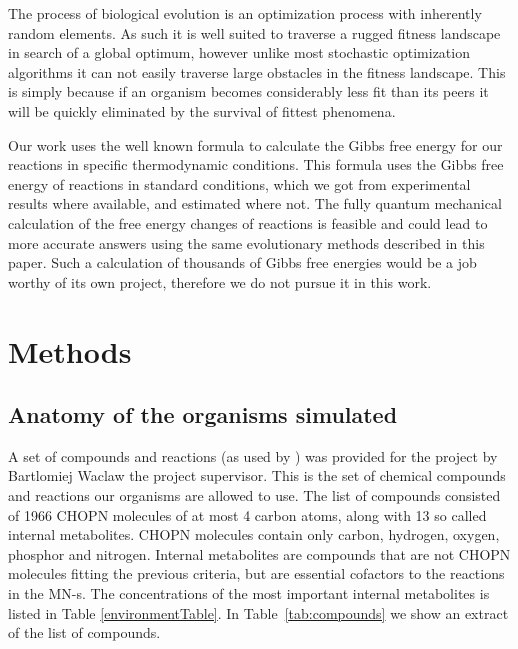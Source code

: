 \documentclass[a4paper,12pt]{article}
\begin{document}
	The process of biological evolution is an optimization process with inherently random elements. As such it is well suited to traverse a rugged fitness landscape in search of a global optimum, however unlike most stochastic optimization algorithms it can not easily traverse large obstacles in the fitness landscape. This is simply because if an organism becomes considerably less fit than its peers it will be quickly eliminated by the survival of fittest phenomena.

	Our work uses the well known formula to calculate the Gibbs free energy for our reactions in specific thermodynamic conditions. This formula uses the Gibbs free energy of reactions in standard conditions, which we got from experimental results where available, and estimated \cite{BartekLower} where not. The fully quantum mechanical calculation of the free energy changes of reactions is feasible and could lead to more accurate answers using the same evolutionary methods described in this paper. Such a calculation of thousands of Gibbs free energies would be a job worthy of its own project, therefore we do not pursue it in this work. 

	
\section{Methods}
\label{sec:methods}



	\subsection{Anatomy of the organisms simulated}
	\label{ssub:anatomy_of_the_oganisms_simulated}


	A set of compounds and reactions (as used by \cite[]{BartekLower}) was provided for the project by Bartlomiej Waclaw the project supervisor. This is the set of chemical compounds and reactions our organisms are allowed to use. The list of compounds consisted of 1966 CHOPN molecules of at most 4 carbon atoms, along with 13 so called internal metabolites. CHOPN molecules contain only carbon, hydrogen, oxygen, phosphor and nitrogen.  Internal metabolites are compounds that are not CHOPN molecules fitting the previous criteria, but are essential cofactors to the reactions in the MN-s. The concentrations of the most important internal metabolites is listed in Table \ref{environmentTable}.  In Table~\ref{tab:compounds} we show an extract of the list of compounds.
	
\end{document}
